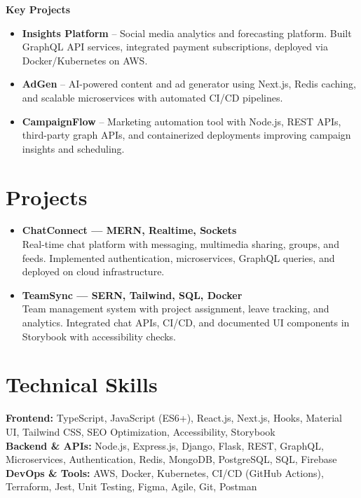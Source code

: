 \documentclass[a4paper,11pt]{article}
\begin{document}
\textbf{Key Projects}
\begin{itemize}
    \item \textbf{Insights Platform} -- Social media analytics and forecasting platform. Built GraphQL API services, integrated payment subscriptions, deployed via Docker/Kubernetes on AWS.
    \item \textbf{AdGen} -- AI-powered content and ad generator using Next.js, Redis caching, and scalable microservices with automated CI/CD pipelines.
    \item \textbf{CampaignFlow} -- Marketing automation tool with Node.js, REST APIs, third-party graph APIs, and containerized deployments improving campaign insights and scheduling.
\end{itemize}

\section*{Projects}

\begin{itemize}
  \item[\textbullet] \textbf{ChatConnect --- MERN, Realtime, Sockets} \\
  Real-time chat platform with messaging, multimedia sharing, groups, and feeds. Implemented authentication, microservices, GraphQL queries, and deployed on cloud infrastructure.
  \vspace{4pt}

  \item[\textbullet] \textbf{TeamSync --- SERN, Tailwind, SQL, Docker} \\
  Team management system with project assignment, leave tracking, and analytics. Integrated chat APIs, CI/CD, and documented UI components in Storybook with accessibility checks.
\end{itemize}

\section*{Technical Skills}

\noindent \textbf{Frontend:} TypeScript, JavaScript (ES6+), React.js, Next.js, Hooks, Material UI, Tailwind CSS, SEO Optimization, Accessibility, Storybook \\
\textbf{Backend \& APIs:} Node.js, Express.js, Django, Flask, REST, GraphQL, Microservices, Authentication, Redis, MongoDB, PostgreSQL, SQL, Firebase \\
\textbf{DevOps \& Tools:} AWS, Docker, Kubernetes, CI/CD (GitHub Actions), Terraform, Jest, Unit Testing, Figma, Agile, Git, Postman
\end{document}

